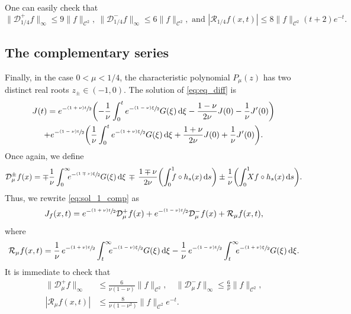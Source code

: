 \documentclass[10pt]{amsart}
\newcommand{\tpsfrac}[3]{\sfrac{(#1)#3}{#2}}
\newcommand*{\diff}{\mathop{}\!\mathrm{d}}
\newcommand{\Dp}[1]{\mathcal{D}_\mu^{+} #1}
\newcommand{\Dm}[1]{\mathcal{D}_\mu^{-} #1}
\newcommand{\Dpm}[1]{\mathcal{D}_\mu^{\pm} #1}
\theoremstyle{definition}
\begin{document}
One can easily check that
\begin{equation*}
\|\mathcal{D}_{1/4}^{+}f\|_{\infty} \leq 9\|f\|_{\mathscr{C}^2}, \ \|\mathcal{D}_{1/4}^{-}f\|_{\infty} \leq 6 \|f\|_{\mathscr{C}^2}, \text{ and } |\mathcal{R}_{1/4}f(x,t) |\leq 8 \|f\|_{\mathscr{C}^2} (t+2)e^{-t}.
\end{equation*}


\subsection{The complementary series}\label{sec:comp}

Finally, in the case $0< \mu < 1/4$, the characteristic polynomial $P_\mu(z)$ has two distinct real roots $z_{\pm} \in (-1,0)$. The solution of \eqref{eq:eq_diff} is
\begin{multline}\label{eq:sol_1_comp}
J(t) = e^{-\tpsfrac{1+\nu}{2}t} \biggl(- \frac{1}{\nu} \int_0^t e^{-\tpsfrac{1-\nu}{2}\xi} G(\xi) \diff \xi - \frac{1-\nu}{2\nu} J(0) - \frac{1}{\nu}J'(0) \biggr) \\
+ e^{-\tpsfrac{1-\nu}{2}t} \biggl(\frac{1}{\nu} \int_0^t e^{-\tpsfrac{1+\nu}{2}\xi} G(\xi) \diff \xi + \frac{1+\nu}{2\nu} J(0) + \frac{1}{\nu}J'(0) \biggr).
\end{multline}
Once again, we define
\[
\Dpm{f}(x) = \mp \frac{1}{\nu} \int_0^\infty \hspace*{-2mm}e^{-\tpsfrac{1 \mp \nu}{2}\xi} G(\xi) \diff \xi \,\mp\, \frac{1 \mp \nu}{2\nu} \biggl(\int_0^1\hspace*{-2mm} f \circ h_s(x) \diff s \biggr) \pm \frac{1}{\nu} \biggl(\int_0^1\hspace*{-2mm} Xf \circ h_s(x) \diff s \biggr).
\]
Thus, we rewrite \eqref{eq:sol_1_comp} as
\begin{equation}\label{eq:I_mu_comp}
J_f(x,t) = e^{-\tpsfrac{1+\nu}{2}t} \Dp{f}(x) + e^{-\tpsfrac{1-\nu}{2}t} \Dm{f}(x) + \mathcal{R}_\mu f(x,t),
\end{equation}
where
\[
\mathcal{R}_\mu f(x,t) = \frac{1}{\nu}\, e^{-\tpsfrac{1+\nu}{2}t} \int_t^{\infty}\hspace*{-2mm} e^{-\tpsfrac{1-\nu}{2}\xi} G(\xi) \diff \xi - \frac{1}{\nu}\, e^{-\tpsfrac{1-\nu}{2}t} \int_t^{\infty}\hspace*{-2mm} e^{-\tpsfrac{1+\nu}{2}\xi} G(\xi) \diff \xi.
\]
It is immediate to check that
\begin{align*}
\|\Dp{f}\|_{\infty} &\leq \frac{6}{\nu(1-\nu)} \|f\|_{\mathscr{C}^2}, \quad \|\Dm{f}\|_{\infty} \leq \frac{6}{\nu} \|f\|_{\mathscr{C}^2},\\
\tag*{and} |\mathcal{R}_\mu f(x,t) |&\leq \frac{8}{\nu(1-\nu^2)} \|f\|_{\mathscr{C}^2} e^{-t}.
\end{align*}
\end{document}
